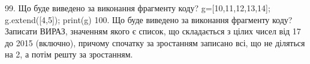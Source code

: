 \documentclass[11pt]{article}
\begin{document}
99. Що буде виведено за виконання фрагменту коду?
g=[10,11,12,13,14]; g.extend([4,5]); print(g)
100. Що буде виведено за виконання фрагменту коду?
Записати ВИРАЗ, значенням якого є список, що складається з цілих чисел від 17 до 2015 (включно), причому спочатку за зростанням записано всі, що не діляться на 2, а потім решту за зростанням.




































































































\newpage
\end{document}
